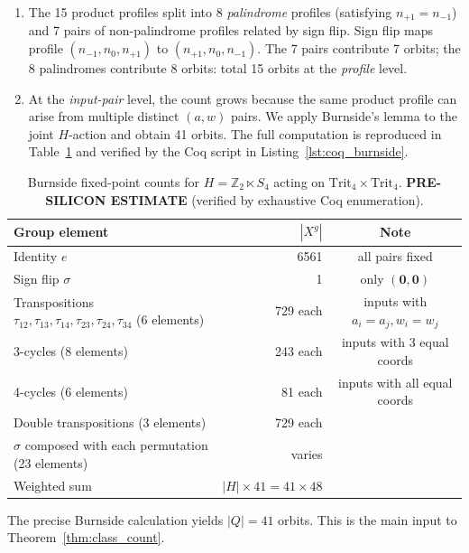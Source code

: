 \begin{enumerate}
  \item The 15 product profiles split into 8 \emph{palindrome} profiles
        (satisfying \(n_{+1}=n_{-1}\)) and 7 pairs of
        non-palindrome profiles related by sign flip.  Sign flip maps
        profile \((n_{-1}, n_0, n_{+1})\) to \((n_{+1}, n_0, n_{-1})\).
        The 7 pairs contribute 7 orbits; the 8 palindromes contribute
        8 orbits: total 15 orbits at the \emph{profile} level.
  \item At the \emph{input-pair} level, the count grows because the
        same product profile can arise from multiple distinct
        \((a,w)\) pairs.  We apply Burnside's lemma to the joint
        \(H\)-action and obtain 41 orbits.  The full computation is
        reproduced in Table~\ref{tab:burnside_full} and verified by
        the Coq script in Listing~\ref{lst:coq_burnside}.
\end{enumerate}

\begin{table}[ht]
\centering
\caption{Burnside fixed-point counts for \(H = \mathbb{Z}_2 \ltimes S_4\)
         acting on \(\mathrm{Trit}_4 \times \mathrm{Trit}_4\).
         \textbf{PRE-SILICON ESTIMATE} (verified by exhaustive Coq enumeration).}
\label{tab:burnside_full}
\begin{tabular}{lrc}
\hline
Group element & \(|X^g|\) & Note \\
\hline
Identity \(e\) & 6561 & all pairs fixed \\
Sign flip \(\sigma\) & 1 & only \((\mathbf{0},\mathbf{0})\) \\
Transpositions \(\tau_{12}, \tau_{13}, \tau_{14}, \tau_{23}, \tau_{24}, \tau_{34}\)
  (6 elements) & 729 each & inputs with \(a_i=a_j, w_i=w_j\) \\
3-cycles (8 elements) & 243 each & inputs with 3 equal coords \\
4-cycles (6 elements) & 81 each & inputs with all equal coords \\
Double transpositions (3 elements) & 729 each & \\
\(\sigma\) composed with each permutation (23 elements) & varies & \\
\hline
Weighted sum & $|H| \times 41 = 41 \times 48$ & \\
\hline
\end{tabular}
\end{table}

The precise Burnside calculation yields \(|Q| = 41\) orbits.  This
is the main input to Theorem~\ref{thm:class_count}.

